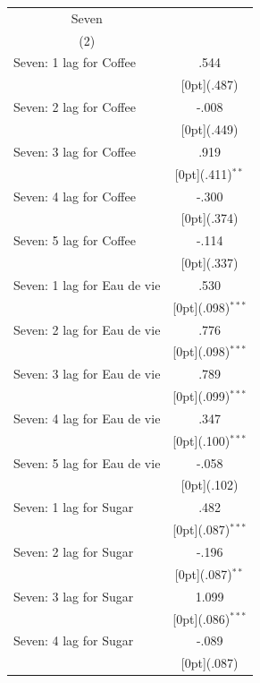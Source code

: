 \documentclass[12pt,a4paper,titlepage]{article}
\begin{document}
{\newpage
{}
\begin{tabular*}{\textwidth}{@{\extracolsep{\fill}}lc}	
	\multicolumn{1}{c}{Seven} \\
\cline{2-2}	
	\multicolumn{1}{c}{(2)} \\
\hline	
Seven: 1 lag for Coffee &	.544 \\
&	\raisebox{.7ex}[0pt]{\scriptsize (.487)} \\
Seven: 2 lag for Coffee &	-.008 \\
&	\raisebox{.7ex}[0pt]{\scriptsize (.449)} \\
Seven: 3 lag for Coffee &	.919 \\
&	\raisebox{.7ex}[0pt]{\scriptsize (.411)$^{**}$} \\
Seven: 4 lag for Coffee &	-.300 \\
&	\raisebox{.7ex}[0pt]{\scriptsize (.374)} \\
Seven: 5 lag for Coffee &	-.114 \\
&	\raisebox{.7ex}[0pt]{\scriptsize (.337)} \\
Seven: 1 lag for Eau de vie &	.530 \\
&	\raisebox{.7ex}[0pt]{\scriptsize (.098)$^{***}$} \\
Seven: 2 lag for Eau de vie &	.776 \\
&	\raisebox{.7ex}[0pt]{\scriptsize (.098)$^{***}$} \\
Seven: 3 lag for Eau de vie &	.789 \\
&	\raisebox{.7ex}[0pt]{\scriptsize (.099)$^{***}$} \\
Seven: 4 lag for Eau de vie &	.347 \\
&	\raisebox{.7ex}[0pt]{\scriptsize (.100)$^{***}$} \\
Seven: 5 lag for Eau de vie &	-.058 \\
&	\raisebox{.7ex}[0pt]{\scriptsize (.102)} \\
Seven: 1 lag for Sugar &	.482 \\
&	\raisebox{.7ex}[0pt]{\scriptsize (.087)$^{***}$} \\
Seven: 2 lag for Sugar &	-.196 \\
&	\raisebox{.7ex}[0pt]{\scriptsize (.087)$^{**}$} \\
Seven: 3 lag for Sugar &	1.099 \\
&	\raisebox{.7ex}[0pt]{\scriptsize (.086)$^{***}$} \\
Seven: 4 lag for Sugar &	-.089 \\
&	\raisebox{.7ex}[0pt]{\scriptsize (.087)} \\

\end{tabular*}}
\end{document}
